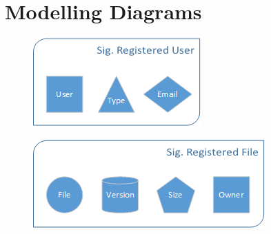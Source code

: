 \documentclass[paper=a4, fontsize=11pt]{scrartcl} %
\numberwithin{equation}{section} %
\numberwithin{figure}{section} %
\numberwithin{table}{section} %
\begin{document}
\section{Modelling Diagrams}
\begin{figure}[h]
  \centering
  \begin{minipage}{0.4\textwidth}
    \includegraphics[width=\textwidth]{sig_reg_user.png}
    \label{fig:reg_user}
    \caption{}
  \end{minipage}
  \hfill
  \begin{minipage}{0.55\textwidth}
    \includegraphics[width=\textwidth]{sig_reg_file.png}
    \label{fig:reg_file}
    \caption{}
  \end{minipage}
  \hfill
\end{figure}
\end{document}
